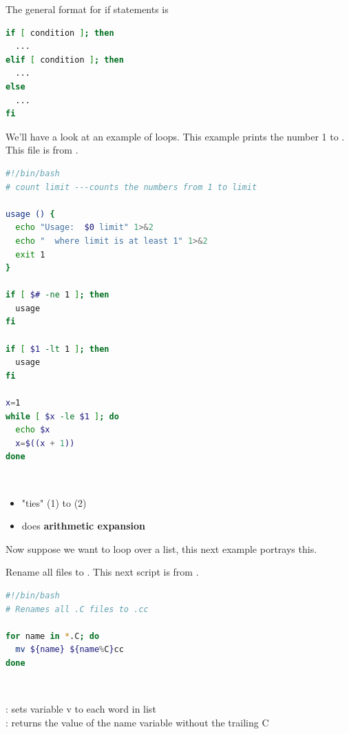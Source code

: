 \documentclass[english, 11pt]{article}
\begin{document}
\begin{notation}
  The general format for if statements is
  \begin{lstlisting}[language=bash]
if [ condition ]; then
  ...
elif [ condition ]; then
  ...
else
  ...
fi
    \end{lstlisting}
\end{notation}
    \begin{exmp}
      We'll have a look at an example of loops. This example prints the number 1 to . This file is from .
  \begin{lstlisting}[language=bash]
#!/bin/bash
# count limit ---counts the numbers from 1 to limit

usage () {
  echo "Usage:  $0 limit" 1>&2
  echo "  where limit is at least 1" 1>&2
  exit 1
}

if [ $# -ne 1 ]; then
  usage
fi

if [ $1 -lt 1 ]; then
  usage
fi

x=1
while [ $x -le $1 ]; do
  echo $x
  x=$((x + 1))
done
    \end{lstlisting}
    \begin{note} \
      \begin{itemize}
        \item {} "ties"  (1) to  (2)
        \item \tc{\$(( ... ))} does \textbf{arithmetic expansion}
      \end{itemize}
    \end{note}
    \end{exmp}

    Now suppose we want to loop over a list, this next example portrays this.

    \begin{exmp}
      Rename all  files to . This next script is from .
      \begin{lstlisting}[language=bash]
#!/bin/bash
# Renames all .C files to .cc

for name in *.C; do
  mv ${name} ${name%C}cc
done
      \end{lstlisting}
      \begin{note} \
      \begin{center}
 : sets variable v to each word in list \\
\tc{\$\{name\%C\}} : returns the value of the name variable without the trailing C
      \end{center}
      \end{note}
    \end{exmp}
\end{document}
